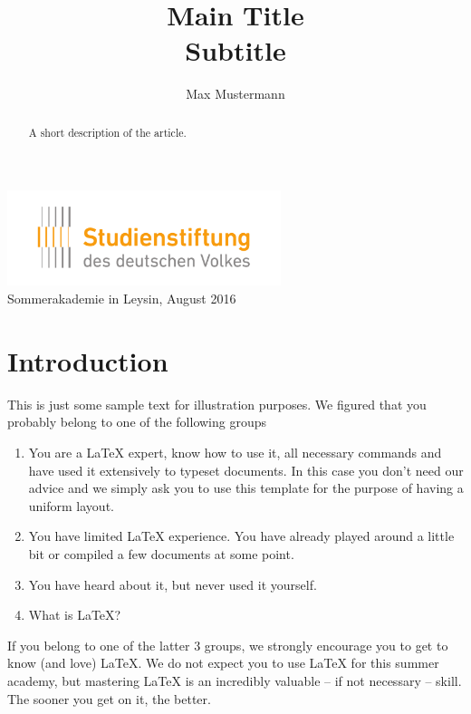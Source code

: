 \documentclass[12pt, a4paper]{article}
\begin{document}
\title{%
  {\bfseries Main Title}\\[1ex] %
  {\large\bfseries Subtitle} %
}
\author{ Max Mustermann} %

\date{\vspace{-5ex}} %

{\sf \maketitle} %

\begin{center}
  \includegraphics[width=8cm]{logo_sdv.pdf}\\
  {\large\sf Sommerakademie in Leysin, August 2016}
\end{center}

\vspace{1cm}

\begin{abstract}
  A short description of the article.
\end{abstract}

\newpage
\tableofcontents

\newpage
\section{Introduction}\label{sec:introduction}

This is just some sample text for illustration purposes. We figured that you
probably belong to one of the following groups
\begin{enumerate}
  \item You are a \LaTeX{} expert, know how to use it, all necessary commands
  and have used it extensively to typeset documents. In this case you don't need
  our advice and we simply ask you to use this template for the purpose of
  having a uniform layout.
  \item You have limited \LaTeX{} experience. You have already played around a
  little bit or compiled a few documents at some point.
  \item You have heard about it, but never used it yourself.
  \item What is \LaTeX{}?
\end{enumerate}
If you belong to one of the latter 3 groups, we strongly encourage you to get to
know (and love) \LaTeX{}. We do not expect you to use \LaTeX{} for this summer
academy, but mastering \LaTeX{} is an incredibly valuable -- if not necessary --
skill. The sooner you get on it, the better.
\end{document}
